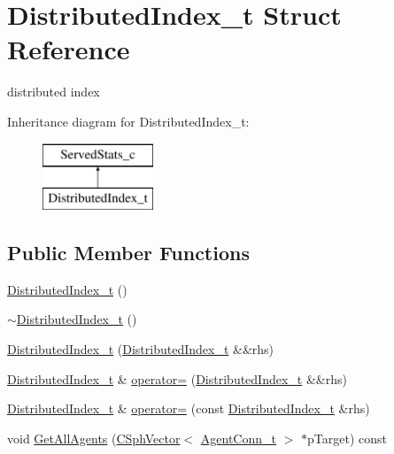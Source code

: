 \hypertarget{structDistributedIndex__t}{\section{Distributed\-Index\-\_\-t Struct Reference}
\label{structDistributedIndex__t}
}


distributed index  


Inheritance diagram for Distributed\-Index\-\_\-t\-:\begin{figure}[H]
\begin{center}
\leavevmode
\includegraphics[height=2.000000cm]{structDistributedIndex__t}
\end{center}
\end{figure}
\subsection*{Public Member Functions}
\begin{DoxyCompactItemize}
\item 
\hyperlink{structDistributedIndex__t_aa842706a494525ff564de2b0b28cc12b}{Distributed\-Index\-\_\-t} ()
\item 
\hyperlink{structDistributedIndex__t_a2abb0b3cd8660c2b20e790fd67b683d2}{$\sim$\-Distributed\-Index\-\_\-t} ()
\item 
\hyperlink{structDistributedIndex__t_af82d5fed65b4a67e2baf8c5be3e5d0c4}{Distributed\-Index\-\_\-t} (\hyperlink{structDistributedIndex__t}{Distributed\-Index\-\_\-t} \&\&rhs)
\item 
\hyperlink{structDistributedIndex__t}{Distributed\-Index\-\_\-t} \& \hyperlink{structDistributedIndex__t_ac252c81877da83f7d0a11baa22689dcf}{operator=} (\hyperlink{structDistributedIndex__t}{Distributed\-Index\-\_\-t} \&\&rhs)
\item 
\hyperlink{structDistributedIndex__t}{Distributed\-Index\-\_\-t} \& \hyperlink{structDistributedIndex__t_aa9f9b3aa41121cc3b6d5b23a337361fc}{operator=} (const \hyperlink{structDistributedIndex__t}{Distributed\-Index\-\_\-t} \&rhs)
\item 
void \hyperlink{structDistributedIndex__t_a442cf202e4ac14520e0c6654080eb5b8}{Get\-All\-Agents} (\hyperlink{classCSphVector}{C\-Sph\-Vector}$<$ \hyperlink{structAgentConn__t}{Agent\-Conn\-\_\-t} $>$ $\ast$p\-Target) const 
\end{DoxyCompactItemize}
